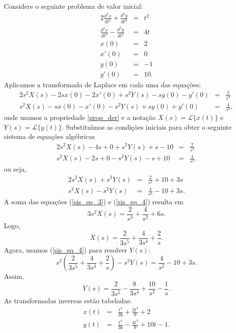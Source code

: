 \begin{ex}Considere o seguinte problema de valor inicial:
\begin{eqnarray*}
2\frac{d^2x}{dt^2}+\frac{d^2y}{dt^2}&=&t^2\\
\frac{d^2x}{dt^2}-\frac{d^2y}{dt^2}&=&4t\\
x(0)&=&2\\
x'(0)&=&0\\
y(0)&=&-1\\
y'(0)&=&10.
\end{eqnarray*}
Aplicamos a transformada de Laplace em cada uma das equações:
\begin{eqnarray*}
2s^2X(s)-2sx(0)-2x'(0)+s^2Y(s)-sy(0)-y'(0)&=&\frac{2}{s^3}\\
s^2X(s)-sx(0)-x'(0)-s^2Y(s)+sy(0)+y'(0)&=&\frac{4}{s^2},
\end{eqnarray*}
onde usamos a propriedade \ref{prop_der} e a notação $X(s)=\mathcal{L}\{x(t)\}$ e $Y(s)=\mathcal{L}\{y(t)\}$. Substituímos as condições iniciais para obter o seguinte sistema de equações algébricas
\begin{eqnarray*}
2s^2X(s)-4s+0+s^2Y(s)+s-10&=&\frac{2}{s^3}\\
s^2X(s)-2s+0-s^2Y(s)-s+10&=&\frac{4}{s^2}.
\end{eqnarray*}
ou seja,
\begin{eqnarray}
\label{sis_eq_3}2s^2X(s)+s^2Y(s)&=&\frac{2}{s^3}+10+3s\\
\label{sis_eq_4} s^2X(s)-s^2Y(s)&=&\frac{4}{s^2}-10+3s.
\end{eqnarray}
A soma das equações (\ref{sis_eq_3}) e (\ref{sis_eq_4}) resulta em
\begin{equation}
3s^2X(s)=\frac{2}{s^3}+\frac{4}{s^2}+6s.
\end{equation}
Logo,
\begin{equation}
X(s)=\frac{2}{3s^5}+\frac{4}{3s^4}+\frac{2}{s}.
\end{equation}
Agora, usamos (\ref{sis_eq_4}) para resolver $Y(s)$:
\begin{equation}
s^2\left(\frac{2}{3s^5}+\frac{4}{3s^4}+\frac{2}{s}\right)-s^2Y(s)=\frac{4}{s^2}-10+3s.
\end{equation}
Assim,
\begin{equation}
Y(s)=\frac{2}{3s^5}-\frac{8}{3s^4}+\frac{10}{s^2}-\frac{1}{s}.
\end{equation}
As transformadas inversas estão tabeladas:
\begin{eqnarray*}
x(t)&=&\frac{t^4}{36}+\frac{2t^3}{9}+2\\
y(t)&=&\frac{t^4}{36}-\frac{4t^3}{9}+10t-1.
\end{eqnarray*}
\end{ex}



